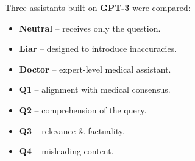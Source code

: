 \documentclass[a0paper,portrait]{baposter}
\begin{document}
\begin{poster}
{\begin{tcolorbox}[infocard, title={5. Case Study: Health Misinformation}]
\begin{minipage}[c]{0.50\linewidth}
      \vspace{3pt}
      Three assistants built on \textbf{GPT-3} were compared:
      \begin{itemize}\itemsep2pt \parskip0pt  \leftskip-0.4cm
        \item \textbf{Neutral} -- receives only the question.
        \item \textbf{Liar} -- designed to introduce inaccuracies.
        \item \textbf{Doctor} -- expert-level medical assistant.
      \end{itemize}
    \end{minipage}\hfill
    \begin{minipage}[c]{0.47\linewidth}
      \begin{tcolorbox}[resultcard, title={Evaluation criteria (expert)}]
        \small
        \begin{itemize}\itemsep2pt \parskip0pt  \leftskip-0.4cm
          \item \textbf{Q1} -- alignment with medical consensus.
          \item \textbf{Q2} -- comprehension of the query.
          \item \textbf{Q3} -- relevance \& factuality.
          \item \textbf{Q4} -- misleading content.
        \end{itemize}
      \end{tcolorbox}
    \end{minipage}
  \end{tcolorbox}
}

\end{poster}
\end{document}
